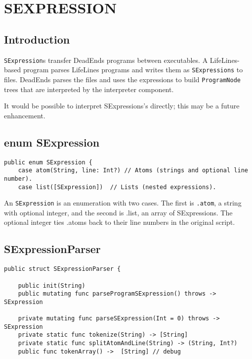 \section{SEXPRESSION}

\subsection{Introduction}

\texttt{SExpression}s transfer DeadEnds programs between executables.
A LifeLines-based program parses LifeLines programs and
writes them as \texttt{SExpressions} to files. DeadEnds 
parses the files and uses the expressions to build \texttt{ProgramNode}
trees that are interpreted by the interpreter
component.

It would be possible to interpret SExpressions's directly; this may
be a future enhancement.

\subsection{enum SExpression}

\begin{verbatim}
public enum SExpression {
    case atom(String, line: Int?) // Atoms (strings and optional line number).
    case list([SExpression])  // Lists (nested expressions).

\end{verbatim}
An \texttt{SExpression} is an enumeration with two cases. The first is \texttt{.atom},
a string with optional integer, and the second is .list, an array
of SExpressions. The optional integer ties .atoms back
to their line numbers in the original script.

\subsection{SExpressionParser}
\begin{verbatim}
public struct SExpressionParser {

    public init(String)
    public mutating func parseProgramSExpression() throws -> SExpression
    
    private mutating func parseSExpression(Int = 0) throws -> SExpression
    private static func tokenize(String) -> [String]
    private static func splitAtomAndLine(String) -> (String, Int?)
    public func tokenArray() ->  [String] // debug

\end{verbatim}

